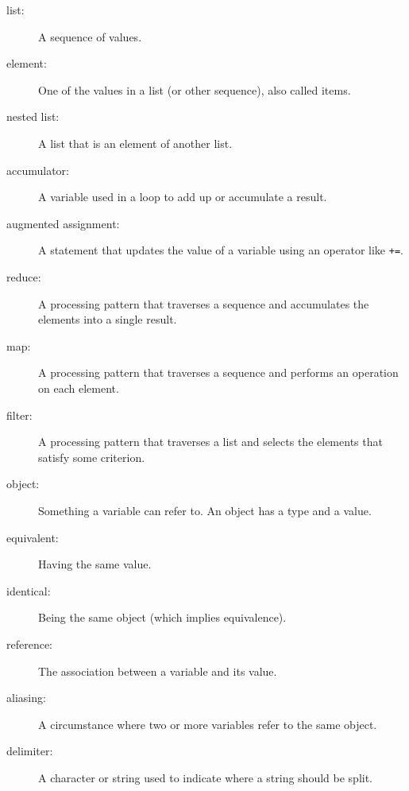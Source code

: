 \documentclass[10pt]{book}
\begin{document}
\begin{description}

\item[list:] A sequence of values.

\item[element:] One of the values in a list (or other sequence),
also called items.

\item[nested list:] A list that is an element of another list.

\item[accumulator:] A variable used in a loop to add up or
accumulate a result.

\item[augmented assignment:] A statement that updates the value
of a variable using an operator like \verb"+=".

\item[reduce:] A processing pattern that traverses a sequence 
and accumulates the elements into a single result.

\item[map:] A processing pattern that traverses a sequence and
performs an operation on each element.

\item[filter:] A processing pattern that traverses a list and
selects the elements that satisfy some criterion.

\item[object:] Something a variable can refer to.  An object
has a type and a value.

\item[equivalent:] Having the same value.

\item[identical:] Being the same object (which implies equivalence).

\item[reference:] The association between a variable and its value.

\item[aliasing:] A circumstance where two or more variables refer to the same
object.

\item[delimiter:] A character or string used to indicate where a
string should be split.

\end{description}
\end{document}
